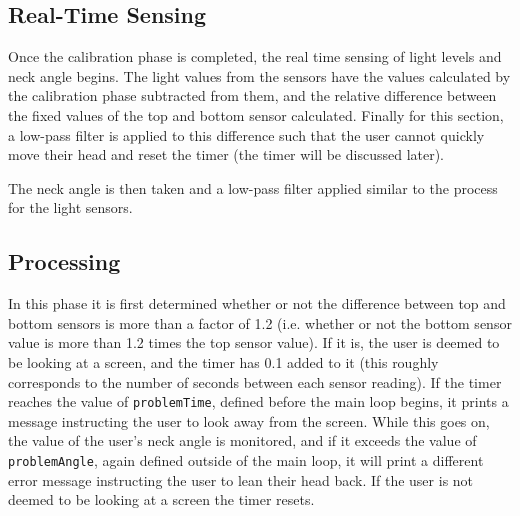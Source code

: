 \documentclass[12pt, a4paper]{report}
\begin{document}


\subsection{Real-Time Sensing}

Once the calibration phase is completed, the real time sensing of light levels and neck angle begins.
The light values from the sensors have the values calculated by the calibration phase subtracted from them, and the relative difference between the fixed values of the top and bottom sensor calculated.
Finally for this section, a low-pass filter is applied to this difference such that the user cannot quickly move their head and reset the timer (the timer will be discussed later).



\par

The neck angle is then taken and a low-pass filter applied similar to the process for the light sensors.



\subsection{Processing}

In this phase it is first determined whether or not the difference between top and bottom sensors is more than a factor of 1.2 (i.e. whether or not the bottom sensor value is more than 1.2 times the top sensor value).
If it is, the user is deemed to be looking at a screen, and the timer has 0.1 added to it (this roughly corresponds to the number of seconds between each sensor reading).
If the timer reaches the value of \verb|problemTime|, defined before the main loop begins, it prints a message instructing the user to look away from the screen.
While this goes on, the value of the user's neck angle is monitored, and if it exceeds the value of \verb|problemAngle|, again defined outside of the main loop, it will print a different error message instructing the user to lean their head back.
If the user is not deemed to be looking at a screen the timer resets.


\end{document}
